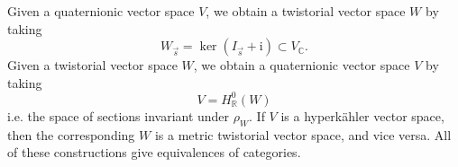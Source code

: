 \documentclass[12pt,letterpaper,reqno]{article}
\numberwithin{equation}{section}
\newcommand{\R}{\ensuremath{\mathbb R}}
\newcommand{\C}{\ensuremath{\mathbb C}}
\newcommand{\hk}{hyperk\"ahler\xspace}
\newcommand{\I}{{\mathrm i}}
\newcommand{\fixme}[1]{{\color{orange}{[#1]}}}
\begin{document}
\begin{prop} \label{prop:twistorial-and-quaternionic-vector-spaces}
Given a quaternionic vector space $V$, we obtain a twistorial
vector space $W$ by taking
\begin{equation}
 W_{\vec s} = \ker(I_{\vec s} + \I) \subset V_\C.
\end{equation}
Given a twistorial vector space $W$, we obtain a
quaternionic vector space $V$ by taking
\begin{equation}
  V = H^0_\R(W)
\end{equation}
i.e. the space of sections invariant under $\rho_W$.
If $V$ is a \hk vector space, then the corresponding $W$
is a metric twistorial vector space, and vice versa.
All of these constructions give equivalences of categories.
\end{prop}

\begin{pf} \fixme{...}
\end{pf}
\end{document}
